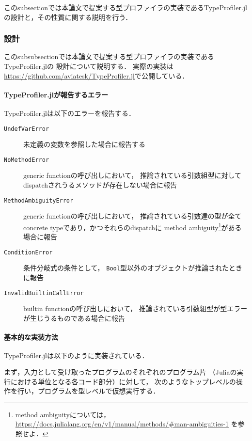 このsubsectionでは本論文で提案する型プロファイラの実装であるTypeProfiler.jlの設計と，その性質に関する説明を行う．

\subsubsection{設計} \label{subsubsection:type-profiler-design}

このsubsubsectionでは本論文で提案する型プロファイラの実装であるTypeProfiler.jlの
設計について説明する．
実際の実装は\url{https://github.com/aviatesk/TypeProfiler.jl}で公開している．

\paragraph{TypeProfiler.jlが報告するエラー}

TypeProfiler.jlは以下のエラーを報告する．

\begin{description}
  \item [\texttt{UndefVarError}] 未定義の変数を参照した場合に報告する
  \item [\texttt{NoMethodError}] generic functionの呼び出しにおいて，
        推論されている引数組型に対してdispatchされうるメソッドが存在しない場合に報告
  \item [\texttt{MethodAmbiguityError}] generic functionの呼び出しにおいて，
        推論されている引数達の型が全てconcrete typeであり，かつそれらのdispatchに
        method ambiguity\footnote{
          method ambiguityについては，
          \url{https://docs.julialang.org/en/v1/manual/methods/\#man-ambiguities-1}
          を参照せよ．
        }がある場合に報告
  \item [\texttt{ConditionError}] 条件分岐式の条件として，
        \verb|Bool|型以外のオブジェクトが推論されたときに報告
  \item [\texttt{InvalidBuiltinCallError}] builtin functionの呼び出しにおいて，
        推論されている引数組型が型エラーが生じうるものである場合に報告
\end{description}

\paragraph{基本的な実装方法} \label{paragraph:type-profiler-basic-implementation}

TypeProfiler.jlは以下のように実装されている．

まず，入力として受け取ったプログラムのそれぞれのプログラム片
（Juliaの実行における単位となる各コード部分）に対して，
次のようなトップレベルの操作を行い，プログラムを型レベルで仮想実行する．

